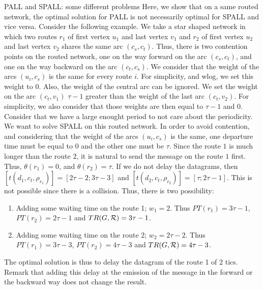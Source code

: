 \documentclass[10pt]{article}
\newcommand\pall{\textsc{PALL}\xspace}
\newcommand\spall{\textsc{SPALL}\xspace}
\begin{document}
     \begin{subsection}{\pall and \spall: some different problems}
Here, we show that on a same routed network, the optimal solution for \pall is not necessarily optimal for \spall and vice versa.
  Consider the following example. We take a star shaped network in which two routes $r_1$ of first vertex $u_1$ and last vertex $v_1$ and $r_2$ of first vertex $u_2$ and last vertex $v_2$ shares the same arc $(c_s,c_t)$. Thus, there is two contention points on the routed network, one on the way forward on the arc $(c_s,c_t )$, and one on the way backward on the arc $(c_t,c_s)$.
  We consider that the weight of the arcs $(u_i,c_s)$ is the same for every route $i$. For simplicity, and wlog, we set this weight to $0$. Also, the weight of the central arc can be ignored.
  We set the weight on the arc $(c_t,v_1)$ $\tau -1$ greater than the weight of the last arc $(c_t,v_2)$. For simplicity, we also consider that those weights are then equal to $\tau-1$ and $0$.
  Consider that we have a large enought period to not care about the periodicity.\\
  
  We want to solve \spall on this routed network. In order to avoid contention, and considering that the weight of the arcs $(u_i,c_s)$ is the same, one departure time must be equal to $0$ and the other one must be $\tau$. Since the route $1$ is much longer than the route $2$, it is natural to send the message on the route $1$ first. Thus, $\theta(r_1) = 0$, and $\theta (r_2) = \tau $. If we do not delay the datagrams, then $[t(d_1,c_t,\rho_{r_1})] = [2\tau -2;3\tau-3]$ and $[t(d_2,c_t,\rho_{r_2})] = [\tau;2\tau-1]$. This is not possible since there is a collision. 
  Thus, there is two possibility: 
  \begin{enumerate}
                                                                                                                                                                                                                                                                                                                                                                                                                                               \item Adding some waiting time on the route 1; $w_1 = 2$. Thus $PT(r_1) = 3\tau-1$, $PT(r_2) = 2\tau -1$ and $TR(G,{\cal R}) =3\tau-1$. 
\item Adding some waiting time on the route 2; $w_2 = 2\tau-2$. Thus $PT(r_1) = 3\tau-3$, $PT(r_2) = 4\tau -3$ and $TR(G,{\cal R}) = 4\tau-3$.                                                                                                                                                                                                                                                             \end{enumerate}
The optimal solution is thus to delay the datagram of the route 1 of $2$ tics. Remark that adding this delay at the emission of the message in the forward or the backward way does not change the result.


\end{subsection}
\end{document}
